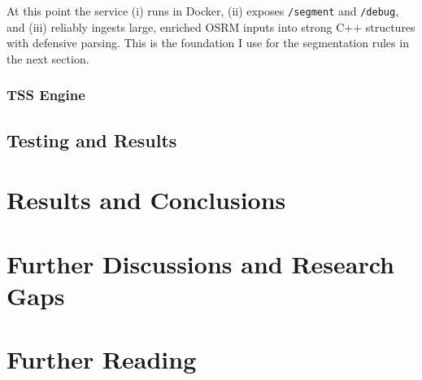\documentclass[11pt,twoside]{report}
\begin{document}
At this point the service (i) runs in Docker, (ii) exposes \texttt{/segment} and \texttt{/debug}, and (iii) reliably ingests large, enriched OSRM inputs into strong C++ structures with defensive parsing. This is the foundation I use for the segmentation rules in the next section.

% 
% 
% 
% 
% 
% 
% 

\subsection{TSS Engine}

\section{Testing and Results}

\chapter{Results and Conclusions}
\label{chap:results}

\chapter{Further Discussions and Research Gaps}
\label{chap:discussion}

\appendix
\chapter{Further Reading}
\label{apx:furtherreading}

\end{document}
